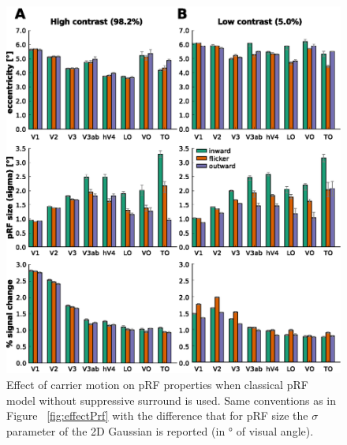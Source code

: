 \begin{figure}[htbp!]
\centering
\includegraphics[width=\textwidth]{figures/chapter_04/fig2b.eps}
\caption{Effect of carrier motion on pRF properties when classical pRF model without suppressive surround is used. Same conventions as in Figure ~\ref{fig:effectPrf} with the difference that for pRF size the $\sigma$ parameter of the 2D Gaussian is reported (in ° of visual angle).}
\label{fig:effectPrf_nosupsur} 
\end{figure}

